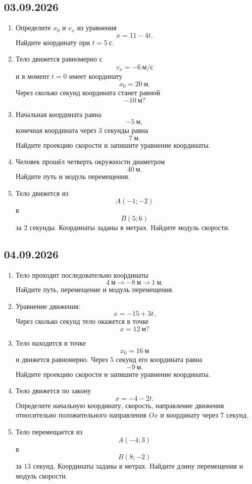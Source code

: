 \documentclass[a4paper,12pt]{article}
\begin{document}
\subsection*{03.09.2026}

\begin{enumerate}[label=\textbf{\arabic*)}]
  \item Определите \(x_0\) и \(v_x\) из уравнения
  \[
  x=11-4t.
  \]
  Найдите координату при \(t=5~\text{с}\).

  \item Тело движется равномерно с
  \[
  v_x=-6~\text{м/с}
  \]
  и в момент \(t=0\) имеет координату
  \[
  x_0=20~\text{м}.
  \]
  Через сколько секунд координата станет равной
  \[
  -10~\text{м}?
  \]

  \item Начальная координата равна
  \[
  -5~\text{м},
  \]
  конечная координата через \(3\) секунды равна
  \[
  7~\text{м}.
  \]
  Найдите проекцию скорости и запишите уравнение координаты.

  \item Человек прошёл четверть окружности диаметром
  \[
  40~\text{м}.
  \]
  Найдите путь и модуль перемещения.

  \item Тело движется из
  \[
  A(-1;-2)
  \]
  в
  \[
  B(5;6)
  \]
  за \(2\) секунды. Координаты заданы в метрах.
  Найдите модуль скорости.
\end{enumerate}

\subsection*{04.09.2026}

\begin{enumerate}[label=\textbf{\arabic*)}]
  \item Тело проходит последовательно координаты
  \[
  4~\text{м}\to -8~\text{м}\to 1~\text{м}.
  \]
  Найдите путь, перемещение и модуль перемещения.

  \item Уравнение движения:
  \[
  x=-15+3t.
  \]
  Через сколько секунд тело окажется в точке
  \[
  x=12~\text{м}?
  \]

  \item Тело находится в точке
  \[
  x_0=16~\text{м}
  \]
  и движется равномерно. Через \(5\) секунд его координата равна
  \[
  -9~\text{м}.
  \]
  Найдите проекцию скорости и запишите уравнение координаты.

  \item Тело движется по закону
  \[
  x=-4-2t.
  \]
  Определите начальную координату, скорость, направление движения относительно положительного направления \(Ox\) и координату через \(7\) секунд.

  \item Тело перемещается из
  \[
  A(-4;3)
  \]
  в
  \[
  B(8;-2)
  \]
  за \(13\) секунд. Координаты заданы в метрах.
  Найдите длину перемещения и модуль скорости.
\end{enumerate}
\end{document}
